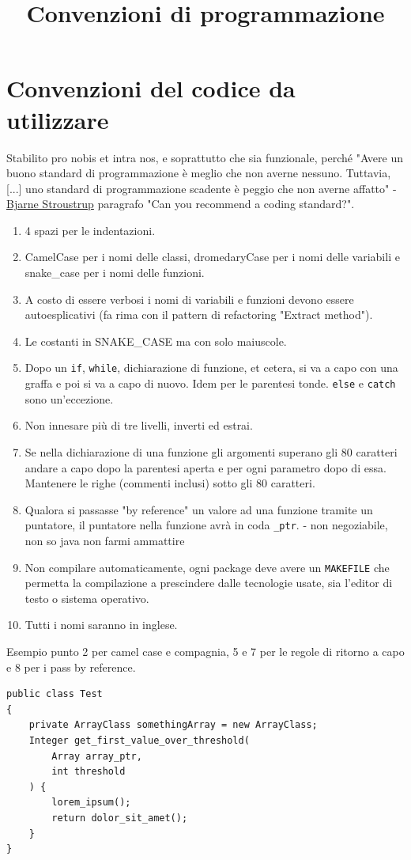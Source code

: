 \documentclass{article}
\title{Convenzioni di programmazione}
\begin{document}
\section{Convenzioni del codice da utilizzare} Stabilito pro nobis et intra 
nos, e soprattutto che sia funzionale, perché "Avere un buono standard di 
programmazione è meglio che non averne nessuno. Tuttavia, [...] uno standard di
programmazione scadente è peggio che non averne affatto" - 
\href{https://stroustrup.com/bs_faq2.html}{Bjarne Stroustrup} paragrafo "Can 
you recommend a coding standard?".
\begin{enumerate}
    \item 4 spazi per le indentazioni.
    \item CamelCase per i nomi delle classi, dromedaryCase per i nomi delle 
    variabili e snake\_case per i nomi delle funzioni.
    \item A costo di essere verbosi i nomi di variabili e funzioni devono 
    essere autoesplicativi (fa rima con il pattern di refactoring "Extract 
    method").
    \item Le costanti in SNAKE\_CASE ma con solo maiuscole.
    \item Dopo un \texttt{if}, \texttt{while}, dichiarazione di funzione, et 
    cetera, si va a capo con una graffa e poi si va a capo di nuovo. Idem 
    per le parentesi tonde. \texttt{else} e \texttt{catch} sono un'eccezione.
    \item Non innesare più di tre livelli, inverti ed estrai.
    \item Se nella dichiarazione di una funzione gli argomenti superano gli 80 
    caratteri andare a capo dopo la parentesi aperta e per ogni parametro dopo
    di essa. Mantenere le righe (commenti inclusi) sotto gli 80 caratteri.
    \item Qualora si passasse "by reference" un valore ad una funzione tramite 
    un puntatore, il puntatore nella funzione avrà in coda \texttt{\_ptr}.
    - non negoziabile, non so java non farmi ammattire
    \item Non compilare automaticamente, ogni package deve avere un 
    \texttt{MAKEFILE} che permetta la compilazione a prescindere dalle 
    tecnologie usate, sia l'editor di testo o sistema operativo.
    \item Tutti i nomi saranno in inglese.
\end{enumerate}
Esempio punto 2 per camel case e compagnia, 5 e 7 per le regole di ritorno a 
capo e 8 per i pass by reference.
\begin{verbatim}
public class Test 
{
    private ArrayClass somethingArray = new ArrayClass;
    Integer get_first_value_over_threshold(
        Array array_ptr, 
        int threshold
    ) {
        lorem_ipsum();
        return dolor_sit_amet();
    }
}
\end{verbatim}
\end{document}
